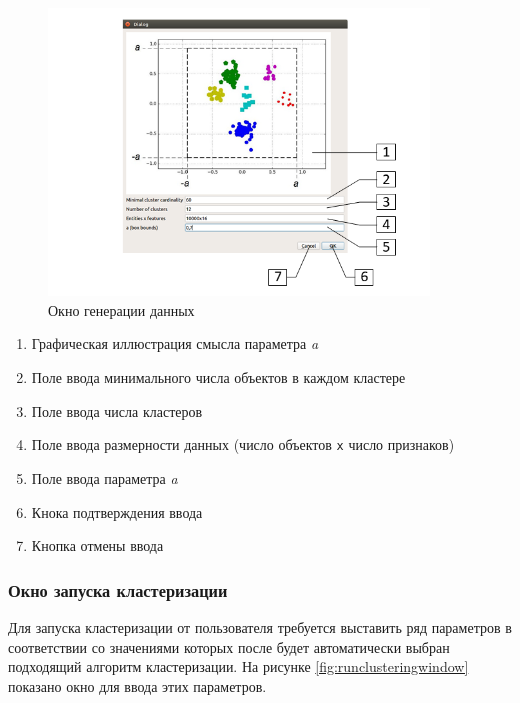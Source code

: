 \documentclass[12pt]{instruction}
\begin{document}
\begin{figure}[h!]
	\centering
	\includegraphics[width=0.9\textwidth]{img/generationwindow}
	\caption{Окно генерации данных}
	\label{fig:generationwindow}
\end{figure}

\begin{enumerate}
	\item Графическая иллюстрация смысла параметра \textit{a}
	\item Поле ввода минимального числа объектов в каждом кластере
	\item Поле ввода числа кластеров
	\item Поле ввода размерности данных (число объектов \texttt{x} число признаков)
	\item Поле ввода параметра \textit{a}
	\item Кнока подтверждения ввода
	\item Кнопка отмены ввода
\end{enumerate}



\subsubsection{Окно запуска кластеризации}

Для запуска кластеризации от пользователя требуется выставить ряд параметров в соответствии со значениями которых после будет автоматически выбран подходящий алгоритм кластеризации. На рисунке \ref{fig:runclusteringwindow} показано окно для ввода этих параметров.
\end{document}
